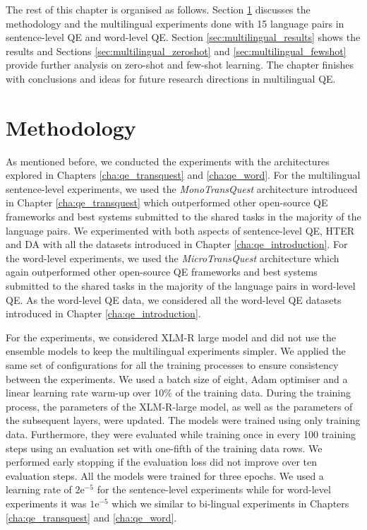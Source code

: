 The rest of this chapter is organised as follows. Section \ref{sec:multilingual_method} discusses the methodology and the multilingual experiments done with 15 language pairs in sentence-level QE and word-level QE.  Section \ref{sec:multilingual_results} shows the results and Sections \ref{sec:multilingual_zeroshot} and \ref{sec:multilingual_fewshot} provide further analysis on zero-shot and few-shot learning. The chapter finishes with conclusions and ideas for future research directions in multilingual QE.
 

\section{Methodology}
\label{sec:multilingual_method}
As mentioned before, we conducted the experiments with the architectures explored in Chapters \ref{cha:qe_transquest} and \ref{cha:qe_word}. For the multilingual sentence-level experiments, we used the \textit{MonoTransQuest} architecture introduced in Chapter \ref{cha:qe_transquest} which outperformed other open-source QE frameworks and best systems submitted to the shared tasks in the majority of the language pairs. We experimented with both aspects of sentence-level QE, HTER and DA with all the datasets introduced in Chapter \ref{cha:qe_introduction}. For the word-level experiments, we used the \textit{MicroTransQuest} architecture which again outperformed other open-source QE frameworks and best systems submitted to the shared tasks in the majority of the language pairs in word-level QE. As the word-level QE data, we considered all the word-level QE datasets introduced in Chapter \ref{cha:qe_introduction}.

For the experiments, we considered XLM-R large model and did not use the ensemble models to keep the multilingual experiments simpler. We applied the same set of configurations for all the training processes to ensure consistency between the experiments. We used a batch size of eight, Adam optimiser and a linear learning rate warm-up over 10\% of the training data. During the training process, the parameters of the XLM-R-large model, as well as the parameters of the subsequent layers, were updated. The models were trained using only training data. Furthermore, they were evaluated while training once in every 100 training steps using an evaluation set with one-fifth of the training data rows. We performed early stopping if the evaluation loss did not improve over ten evaluation steps. All the models were trained for three epochs. We used a learning rate of $2\mathrm{e}^{-5}$ for the sentence-level experiments while for word-level experiments it was $1\mathrm{e}^{-5}$ which we similar to bi-lingual experiments in Chapters \ref{cha:qe_transquest} and \ref{cha:qe_word}.



